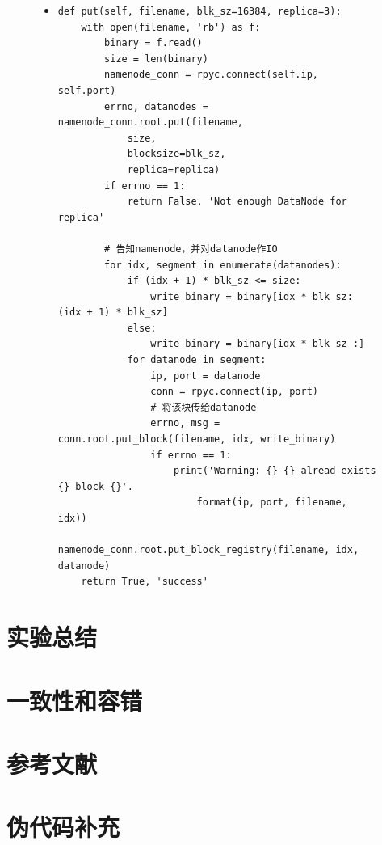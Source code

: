 \documentclass[a4paper]{article}
\begin{document}
\begin{figure}[!hbt]
\begin{itemize}
\item[] \begin{lstlisting}[style=mypython, label=lst:connector, caption=connector的具体代码]
def put(self, filename, blk_sz=16384, replica=3):
    with open(filename, 'rb') as f:
        binary = f.read()
        size = len(binary)
        namenode_conn = rpyc.connect(self.ip, self.port)
        errno, datanodes = namenode_conn.root.put(filename, 
            size, 
            blocksize=blk_sz, 
            replica=replica)
        if errno == 1:
            return False, 'Not enough DataNode for replica'

        # 告知namenode，并对datanode作IO
        for idx, segment in enumerate(datanodes):
            if (idx + 1) * blk_sz <= size:
                write_binary = binary[idx * blk_sz: (idx + 1) * blk_sz]
            else:
                write_binary = binary[idx * blk_sz :]
            for datanode in segment:
                ip, port = datanode
                conn = rpyc.connect(ip, port)
                # 将该块传给datanode
                errno, msg = conn.root.put_block(filename, idx, write_binary)
                if errno == 1:
                    print('Warning: {}-{} alread exists {} block {}'.
                        format(ip, port, filename, idx))
                namenode_conn.root.put_block_registry(filename, idx, datanode)
    return True, 'success'
\end{lstlisting}
\end{itemize}
\end{figure}

\section{实验总结}
\section{一致性和容错}
\begin{appendices}
\section{参考文献} \label{sec:reference}
\section{伪代码补充} \label{sec:file}

\end{appendices}
\end{document}
